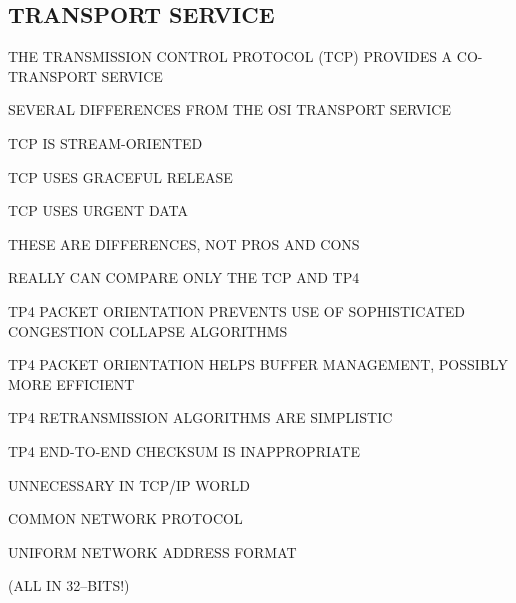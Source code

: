 \begin{bwslide}
\part*	{TRANSPORT SERVICE}\bf

\begin{nrtc}
\item	THE TRANSMISSION CONTROL PROTOCOL (TCP) PROVIDES A CO-TRANSPORT
	SERVICE

\item	SEVERAL DIFFERENCES FROM THE OSI TRANSPORT SERVICE
    \begin{nrtc}
    \item	TCP IS STREAM-ORIENTED

    \item	TCP USES GRACEFUL RELEASE

    \item	TCP USES URGENT DATA
    \end{nrtc}

\item	THESE ARE DIFFERENCES, NOT PROS AND CONS
\end{nrtc}
\end{bwslide}


\begin{bwslide}

\begin{nrtc}
\item	REALLY CAN COMPARE ONLY THE TCP AND TP4

\item	TP4 PACKET ORIENTATION PREVENTS USE OF SOPHISTICATED CONGESTION
	COLLAPSE ALGORITHMS

\item	TP4 PACKET ORIENTATION HELPS BUFFER MANAGEMENT,
	POSSIBLY MORE EFFICIENT

\item	TP4 RETRANSMISSION ALGORITHMS ARE SIMPLISTIC

\item	TP4 END-TO-END CHECKSUM IS INAPPROPRIATE
\end{nrtc}
\end{bwslide}


\begin{bwslide}

\begin{nrtc}
\item	UNNECESSARY IN TCP/IP WORLD
    \begin{nrtc}
    \item	COMMON NETWORK PROTOCOL

    \item	UNIFORM NETWORK ADDRESS FORMAT
	\begin{nrtc}
	\item	(ALL IN 32--BITS!)
	\end{nrtc}
    \end{nrtc}
\end{nrtc}
\end{bwslide}


